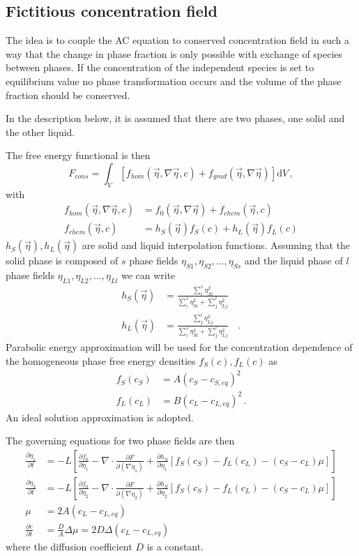 \subsection{Fictitious concentration field}
The idea is to couple the AC equation to conserved concentration field in such a way that the change in phase fraction is only possible with exchange of species between phases. If the concentration of the independent species is set to equilibrium value no phase transformation occurs and the volume of the phase fraction should be conserved. 

In the description below, it is assumed that there are two phases, one solid and the other liquid.

The free energy functional is then
\begin{equation}
	F_{cons} = \int_V \left[ f_{hom}(\vec{\eta},\nabla\vec{\eta},c) + f_{grad}(\vec{\eta},\nabla\vec{\eta}) \right] \mathrm{d}V \,,
\end{equation}
with   
\begin{align}
	f_{hom}(\vec{\eta},\nabla\vec{\eta},c)  &= f_0(\vec{\eta},\nabla\vec{\eta}) + f_{chem}(\vec{\eta},c) \\
	f_{chem}(\vec{\eta},c) &= h_S(\vec{\eta})f_S(c) + h_L(\vec{\eta})f_L(c)
\end{align}
$h_S(\vec{\eta}), h_L(\vec{\eta})$ are solid and liquid interpolation functions. Assuming that the solid phase is composed of $s$ phase fields $\eta_{S1},\eta_{S2},\dots,\eta_{Ss}$ and the liquid phase of $l$ phase fields $\eta_{L1},\eta_{L2},\dots,\eta_{Ll}$ we can write
\begin{align}
	h_S(\vec{\eta}) &= \frac{\sum_i^s \eta_{Si}^2}{\sum_i^s \eta_{Si}^2 + \sum_j^l \eta_{Lj}^2}   \\
	h_L(\vec{\eta}) &= \frac{\sum_j^l \eta_{Lj}^2}{\sum_i^s \eta_{Si}^2 + \sum_j^l \eta_{Lj}^2} \quad .
\end{align}
Parabolic energy approximation will be used for the concentration dependence of the homogeneous phase free energy densities $f_S(c), f_L(c)$ as
\begin{align}
	f_S(c_S) &= A(c_S-c_{S,eq})^2 \\
	f_L(c_L) &= B(c_L-c_{L,eq})^2 \,.
\end{align}
An ideal solution approximation is adopted.

The governing equations for two phase fields are then
\begin{align}
	\frac{\partial \eta_1}{\partial t} &= -L\left[\frac{\partial f_0}{\partial \eta_1} - \nabla\cdot \frac{\partial F}{\partial (\nabla\eta_1)} + \frac{\partial h_S}{\partial \eta_1}[f_S(c_S) - f_L(c_L) - (c_S-c_L)\mu] \right] \\
	\frac{\partial \eta_2}{\partial t} &= -L\left[\frac{\partial f_0}{\partial \eta_2} - \nabla\cdot \frac{\partial F}{\partial (\nabla\eta_2)} + \frac{\partial h_S}{\partial \eta_2}[f_S(c_S) - f_L(c_L) - (c_S-c_L)\mu] \right] \\
	\mu &= 2A(c_L-c_{L,eq})\\
	\frac{\partial c}{\partial t} &= \frac{D}{A}\Delta\mu  = 2D\Delta(c_L-c_{L,eq})
\end{align}
where the diffusion coefficient $D$ is a constant.

